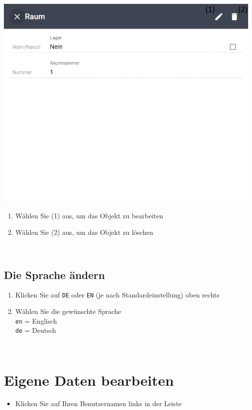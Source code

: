 \documentclass[11pt,a4paper]{report}
\begin{document}
	\begin{minipage}{0.4\linewidth}
	\includegraphics[scale=0.55]{ObjektInventaredit.png}
	\end{minipage}
	\hfill
	\begin{minipage}{0.4\linewidth}
	\begin{enumerate}[3]
		\item Wählen Sie (1) aus, um das Objekt zu bearbeiten
		\item Wählen Sie (2) aus, um das Objekt zu löschen
	\end{enumerate}
	\end{minipage}\\

	\subsection{Die Sprache ändern}
	\begin{enumerate}
		\item Klicken Sie auf \texttt{DE} oder \texttt{EN} (je nach Standardeinstellung) oben rechts
		\item Wählen Sie die gewünschte Sprache\\
		\texttt{en} = Englisch\\
		\texttt{de} = Deutsch
	\end{enumerate}\\

	\section{Eigene Daten bearbeiten}
	\begin{itemize}
		\item Klicken Sie auf Ihren Benutzernamen links in der Leiste
	\end{itemize}\\
\end{document}
